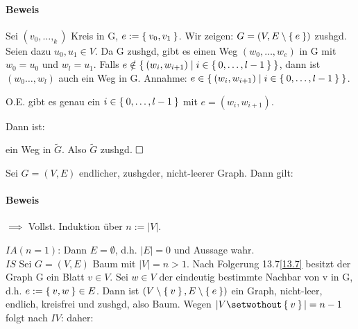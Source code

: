 \documentclass{../../meta/tudscript}
\begin{document}
        \paragraph{Beweis}
        Sei $(v_0, \ldots, _k)$ Kreis in G, $e := \Set{v_0, v_1}$.
        Wir zeigen: $G = (V, E \setminus \Set{e})$ zushgd.
        Seien dazu $u_0, u_1 \in V$. Da G zushgd, gibt es einen Weg $(w_0, \ldots, w_e)$ in G mit $w_0 = u_0$ und $w_l = u_1$.
        Falls $e \notin \Set{(w_i, w_{i + 1}) \mid i \in \Set{0, \ldots, l-1}}$, dann ist $(w_0  \ldots, w_l)$ auch ein Weg in G. Annahme:
        $e \in \Set{(w_i, w_{i+1}) \mid i \in \Set{0, \ldots, l-1}}$.

        O.E. gibt es genau ein $i \in \Set{0, \ldots, l-1}$ mit $e = (w_i, w_{i+1})$.

        Dann ist:

        ein Weg in $\tilde{G}$. Also $\tilde{G}$ zushgd. $\hfill\square$
        
        Sei $G = (V, E)$ endlicher, zushgder, nicht-leerer Graph. Dann gilt:

        \paragraph{Beweis}
        \underline{$\implies$} Vollst. Induktion über $n := |V|$.

        $\boxed{IA} (n = 1)$: Dann $E= \emptyset$, d.h. $|E| = 0$ und Aussage wahr. \\
        $\boxed{IS}$ Sei $G = (V, E)$ Baum mit $|V| = n > 1$.
        Nach Folgerung 13.7\ref{13.7} besitzt der Graph G ein Blatt $v \in V$. Sei $w \in V$ der eindeutig bestimmte Nachbar von v in G, d.h. $e := \Set{v, w} \in E$.
        Dann ist $(V \setminus \Set{v}, E \setminus \Set{e})$ ein Graph, nicht-leer, endlich, kreisfrei und zushgd, also Baum. Wegen $|V \setwothout \Set{v}| = n-1$
        folgt nach $\boxed{IV}$:
        daher:

        
\end{document}
